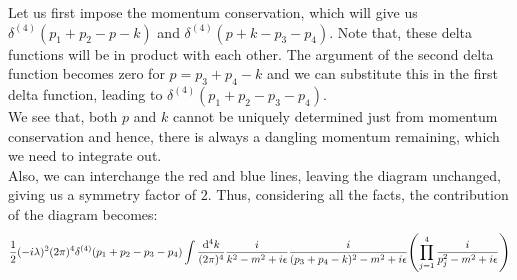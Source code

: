 Let us first impose the momentum conservation, which will give us $\delta^{(4)}(p_1+p_2-p-k)$ and $\delta^{(4)}(p+k-p_3-p_4)$. Note that, these delta functions will be in product with each other. The argument of the second delta function becomes zero for $p=p_3+p_4-k$ and we can substitute this in the first delta function, leading to $\delta^{(4)}(p_1+p_2-p_3-p_4)$.\\[0.2cm] We see that, both $p$ and $k$ cannot be uniquely determined just from momentum conservation and hence, there is always a dangling momentum remaining, which we need to integrate out. \\[0.2cm]
Also, we can interchange the red and blue lines, leaving the diagram unchanged, giving us a symmetry factor of $2$. Thus, considering all the facts, the contribution of the diagram becomes:
$$\frac{1}{2}(-i\lambda)^2 (2\pi)^4\delta^{(4)}(p_1+p_2-p_3-p_4)\int \frac{\dd^4 k}{(2\pi)^4}\frac{i}{k^2-m^2+i\epsilon} \frac{i}{(p_3+p_4-k)^2-m^2+i\epsilon}   \qty(\prod\limits_{j=1}^4\frac{i}{p_j^2-m^2+i\epsilon})$$
